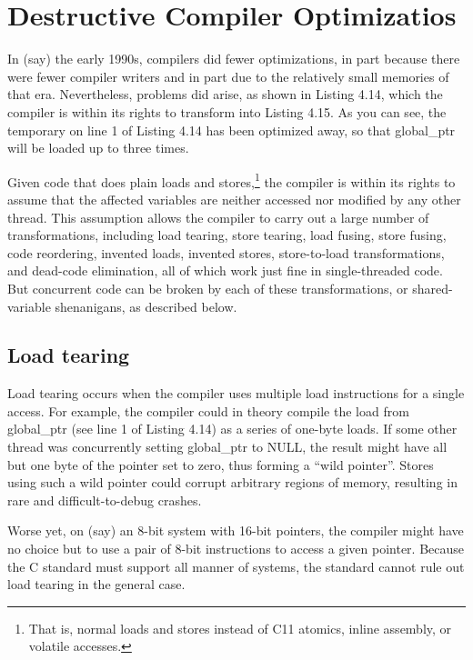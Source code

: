 \newpage

\section{Destructive Compiler Optimizatios}

In (say) the early 1990s, compilers did fewer optimizations,
in part because there were fewer compiler writers and in part due to the
relatively small memories of that era. Nevertheless, problems did arise, as
shown in Listing 4.14, which the compiler is within its rights to transform
into Listing 4.15. As you can see, the temporary on line 1 of Listing 4.14
has been optimized away, so that global\_ptr will be loaded up to three
times.

Given code that does plain loads and stores,\footnote{That is, normal loads and stores instead of C11 atomics, inline assembly, or volatile
accesses.} the compiler is within its rights
to assume that the affected variables are neither accessed nor modified by
any other thread. This assumption allows the compiler to carry out a large
number of transformations, including load tearing, store tearing, load fusing,
store fusing, code reordering, invented loads, invented stores, store-to-load
transformations, and dead-code elimination, all of which work just fine in
single-threaded code. But concurrent code can be broken by each of these
transformations, or shared-variable shenanigans, as described below.



\subsection{Load tearing}

Load tearing occurs when the compiler uses multiple load instructions
for a single access. For example, the compiler could in theory compile the
load from global\_ptr (see line 1 of Listing 4.14) as a series of one-byte
loads. If some other thread was concurrently setting global\_ptr to NULL,
the result might have all but one byte of the pointer set to zero, thus forming
a “wild pointer”. Stores using such a wild pointer could corrupt arbitrary
regions of memory, resulting in rare and difficult-to-debug crashes.

Worse yet, on (say) an 8-bit system with 16-bit pointers, the compiler
might have no choice but to use a pair of 8-bit instructions to access a given
pointer. Because the C standard must support all manner of systems, the
standard cannot rule out load tearing in the general case.

